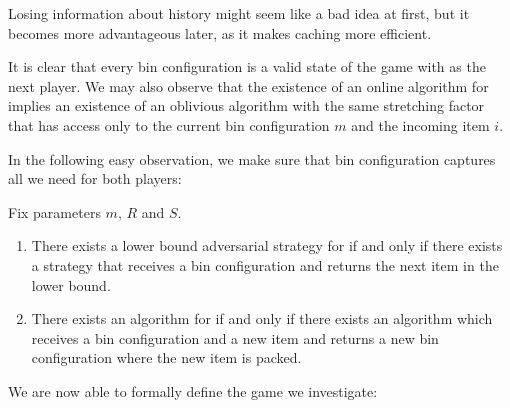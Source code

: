 Losing information about history might seem like a bad idea at first,
but it becomes more advantageous later, as it makes caching more
efficient.

It is clear that every bin configuration is a valid state of the game
with \adversary as the next player. We may also observe that the
existence of an online algorithm for \binstretch implies an existence
of an oblivious algorithm with the same stretching factor that has
access only to the current bin configuration $m$ and the incoming item
$i$.

In the following easy observation, we make sure that bin configuration
captures all we need for both players:

\begin{obs} Fix parameters $m$, $R$ and $S$.
\begin{enumerate}
\item There exists a lower bound adversarial strategy for \binstretch if and only if there exists a strategy
that receives a bin configuration and returns the next item in the lower bound.
\item There exists an algorithm for \binstretch if and only if there exists an algorithm which receives
a bin configuration and a new item and returns a new bin configuration where the new item is packed.
\end{enumerate}
\end{obs}

We are now able to formally define the game we investigate:


